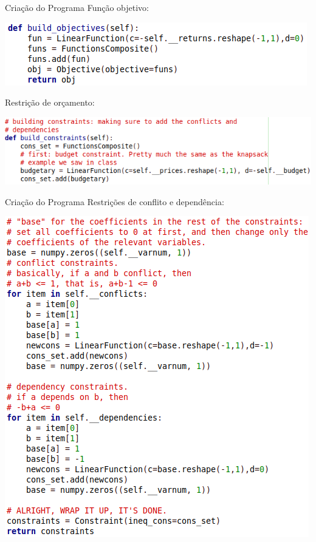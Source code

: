 \documentclass{beamer}
\begin{document}
\begin{frame}{Criação do Programa}
Função objetivo: 
\begin{center}
\includegraphics[scale=0.4]{OBJECTIVE_FOR_PRESENTATION.png}
\end{center}\pause
Restrição de orçamento:
\begin{center}
\includegraphics[scale=0.4]{BUDGET_FOR_PRESENTATION.png}
\end{center}
\end{frame}

\begin{frame}{Criação do Programa}
Restrições de conflito e dependência:
\begin{center}
\includegraphics[scale=0.4]{BINARY_RESTRICTIONS_FOR_PRESENTATION.png}
\end{center}
\end{frame}
\end{document}
